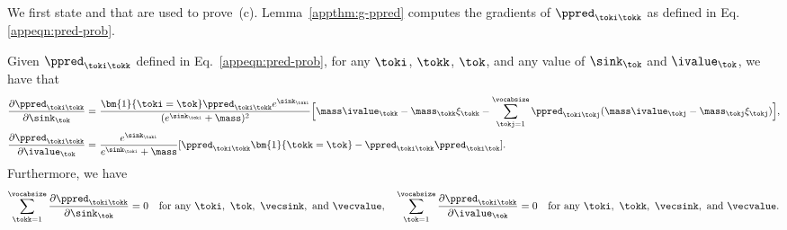 We first state  and  that are used to prove~(c). Lemma~\ref{appthm:g-ppred} computes the gradients of $\ppred_{\toki\tokk}$ as defined in Eq. \eqref{appeqn:pred-prob}. %
\begin{lemma}\label{appthm:g-ppred} 
Given $\ppred_{\toki\tokk}$ defined in Eq.~\eqref{appeqn:pred-prob}, for any $\toki$, $\tokk$, $\tok$,  and any value of $\sink_\tok$ and $\ivalue_\tok$, we have that
\begin{align*}
\frac{\partial \ppred_{\toki\tokk}}{\partial \sink_\tok} = &~ \frac{\bm{1}\{\toki=\tok\} \ppred_{\toki\tokk}e^{\sink_\toki}}{(e^{\sink_\toki}+\mass)^2} \Big[\mass\ivalue_\tokk-\mass_\tokk \xi_\tokk - \sum_{\tokj=1}^\vocabsize \ppred_{\toki\tokj} (\mass\ivalue_\tokj -\mass_\tokj\xi_\tokj)\Big],\\
\frac{\partial \ppred_{\toki\tokk}}{\partial \ivalue_\tok} = &~ \frac{e^{\sink_\toki}}{e^{\sink_\toki}+\mass}[\ppred_{\toki\tokk}\bm{1}\{\tokk=\tok\} - \ppred_{\toki\tokk}\ppred_{\toki\tok}].\\
\end{align*}
Furthermore, we have
\[
\sum_{\tokk=1}^\vocabsize \frac{\partial \ppred_{\toki\tokk}}{\partial \sink_\tok} = 0~~~\text{for any }\toki,\ \tok,\ \vecsink,\ \text{and }\vecvalue, \quad \sum_{\tok=1}^\vocabsize \frac{\partial \ppred_{\toki\tokk}}{\partial \ivalue_\tok} = 0~~~\text{for any }\toki,\ \tokk,\ \vecsink,\ \text{and }\vecvalue.
\]
\end{lemma}
